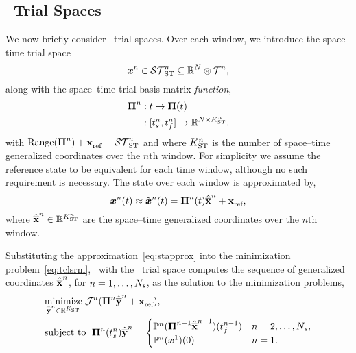 \subsection{\spaceTimeAcronym\ Trial Spaces}
We now briefly consider \spaceTimeAcronym\ trial spaces. Over 
each window, we introduce the space--time trial space
$$ \stateArgnt{n} \in \stspaceSTArg{n} \subseteq \RR{N} \otimes \timeSpaceArg{n},$$
along with the space--time trial basis matrix \textit{function}, 
\begin{align*}
\stbasisArgnt{n} &: t \mapsto \stbasis(t) \\
 &: [\timeStartArg{n},\timeEndArg{n}] \rightarrow  \RR{N \times \stdimArg{n}}  ,%
\end{align*}
with $\text{Range}(\stbasisArgnt{n}) + \stateInterceptArg{} \equiv \stspaceSTArg{n} $ and where $\stdimArg{n}$ is the number of space--time generalized coordinates over the $n$th window. 
For simplicity we assume the reference state to be equivalent for each time window, although no such requirement is necessary. 
The state over each window is approximated by,
\begin{equation}\label{eq:stapprox}
 \stateFOMArg{n}{t} \approx \approxstateArg{n}{t}  = \stbasisArg{n}{t} \stgenstateArg{n} + \stateInterceptArg{},
\end{equation}
where $\stgenstateArg{n} \in \RR{\stdimArg{n}}$ are the space--time generalized coordinates over the $n$th window.


Substituting the approximation~\eqref{eq:stapprox} into the minimization problem~\eqref{eq:tclsrm}, \methodAcronym\ with 
the \spaceTimeAcronym\ trial space computes the sequence of generalized coordinates $\stgenstateArg{n}$, for $n=1,\ldots,\nslabs$, as the solution to the minimization problems,
\begin{align}\label{eq:obj_gen_slab_spacetime}
\begin{split}
&\underset{\stgenstateyArg{n} \in \RR{\stdim}}{\text{minimize}}\; \mathcal{J}^n( \stbasisArgnt{n} \stgenstateyArg{n} + \stateInterceptArg{n} ), \\ 
      &\text{subject to }\;  \stbasisArg{n}{\timeStartArg{n}}\stgenstateyArg{n}  =
  \begin{cases} 
\mathbb{P}^n(\stbasisArgnt{n-1}\stgenstateArg{n-1})(\timeEndArg{n-1})  & n = 2,\ldots,\nslabs, \\ 
\mathbb{P}^n(\stateFOMArgnt{1})(0)
 & n=1. \end{cases}
\end{split}
\end{align}

